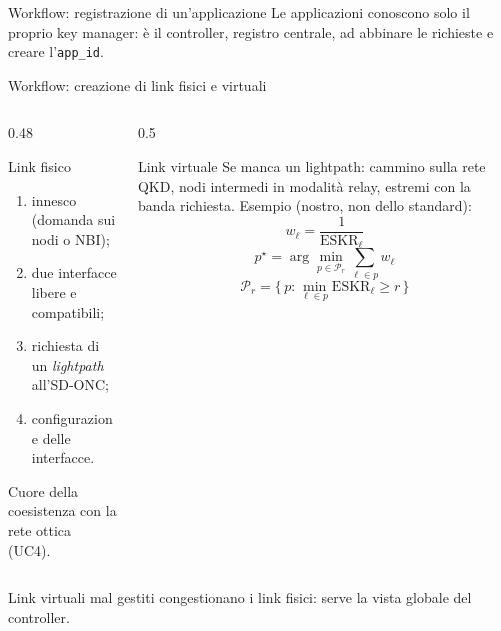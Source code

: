 \documentclass[10pt]{beamer}
\begin{document}
\begin{frame}{Workflow: registrazione di un'applicazione}
  \small Le applicazioni conoscono solo il proprio key manager: è il
  controller, \alert{registro centrale}, ad abbinare le richieste e creare
  l'\texttt{app\_id}.
\end{frame}

\begin{frame}{Workflow: creazione di link fisici e virtuali}
  \begin{columns}[T]
    \begin{column}{0.48\textwidth}
      \begin{block}{Link fisico}
        \begin{enumerate}\small
          \item innesco (domanda sui nodi o NBI);
          \item due interfacce libere e compatibili;
          \item richiesta di un \emph{lightpath} all'SD-ONC;
          \item configurazione delle interfacce.
        \end{enumerate}
        \footnotesize Cuore della coesistenza con la rete ottica (UC4).
      \end{block}
    \end{column}
    \begin{column}{0.5\textwidth}
      \begin{block}{Link virtuale}
        \small Se manca un lightpath: cammino sulla rete QKD, nodi
        intermedi in modalità relay, estremi con la banda richiesta.
        Esempio (nostro, non dello standard):
        \[
          w_\ell = \frac{1}{\mathrm{ESKR}_\ell}
        \]
        \[
          p^\star = \arg\min_{p\in\mathcal{P}_r} \sum_{\ell\in p} w_\ell
        \]
        \[
          \mathcal{P}_r = \Big\{\, p : \min_{\ell\in p}\mathrm{ESKR}_\ell \ge r \,\Big\}
        \]
      \end{block}
    \end{column}
  \end{columns}
  \vspace{1ex}
  \small Link virtuali mal gestiti congestionano i link fisici: serve la
  vista globale del controller.
\end{frame}
\end{document}
